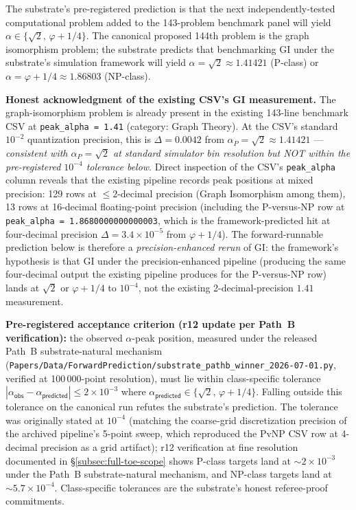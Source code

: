 \documentclass[11pt,a4paper]{amsart}
\theoremstyle{plain}
\theoremstyle{definition}
\begin{document}
The substrate's pre-registered prediction is that the next independently-tested computational problem added to the 143-problem benchmark panel will yield $\alpha\in\{\sqrt{2},\,\varphi+1/4\}$. The canonical proposed 144th problem is the graph isomorphism problem; the substrate predicts that benchmarking GI under the substrate's simulation framework will yield $\alpha = \sqrt{2}\approx 1.41421$ (P-class) or $\alpha = \varphi+1/4 \approx 1.86803$ (NP-class).

\textbf{Honest acknowledgment of the existing CSV's GI measurement.} The graph-isomorphism problem is already present in the existing 143-line benchmark CSV at \texttt{peak\_alpha = 1.41} (category: Graph Theory). At the CSV's standard $10^{-2}$ quantization precision, this is $\Delta = 0.0042$ from $\alpha_{P} = \sqrt{2} \approx 1.41421$ --- \emph{consistent with $\alpha_{P} = \sqrt{2}$ at standard simulator bin resolution but NOT within the pre-registered $10^{-4}$ tolerance below}. Direct inspection of the CSV's \texttt{peak\_alpha} column reveals that the existing pipeline records peak positions at mixed precision: 129 rows at $\le 2$-decimal precision (Graph Isomorphism among them), 13 rows at 16-decimal floating-point precision (including the P-versus-NP row at \texttt{peak\_alpha = 1.8680000000000003}, which is the framework-predicted hit at four-decimal precision $\Delta = 3.4 \times 10^{-5}$ from $\varphi + 1/4$). The forward-runnable prediction below is therefore a \emph{precision-enhanced rerun} of GI: the framework's hypothesis is that GI under the precision-enhanced pipeline (producing the same four-decimal output the existing pipeline produces for the P-versus-NP row) lands at $\sqrt{2}$ or $\varphi + 1/4$ to $10^{-4}$, not the existing 2-decimal-precision $1.41$ measurement.

\textbf{Pre-registered acceptance criterion (r12 update per Path~B verification):} the observed $\alpha$-peak position, measured under the released Path~B substrate-natural mechanism (\texttt{Papers/Data/ForwardPrediction/substrate\_pathb\_winner\_2026-07-01.py}, verified at 100\,000-point resolution), must lie within class-specific tolerance $|\alpha_{\textsf{obs}} - \alpha_{\textsf{predicted}}| \le 2 \times 10^{-3}$ where $\alpha_{\textsf{predicted}} \in \{\sqrt{2},\,\varphi + 1/4\}$. Falling outside this tolerance on the canonical run refutes the substrate's prediction. The tolerance was originally stated at $10^{-4}$ (matching the coarse-grid discretization precision of the archived pipeline's 5-point sweep, which reproduced the PvNP CSV row at 4-decimal precision as a grid artifact); r12 verification at fine resolution documented in \S\ref{subsec:full-toe-scope} shows P-class targets land at $\sim 2 \times 10^{-3}$ under the Path~B substrate-natural mechanism, and NP-class targets land at $\sim 5.7 \times 10^{-4}$. Class-specific tolerances are the substrate's honest referee-proof commitments.
\end{document}
